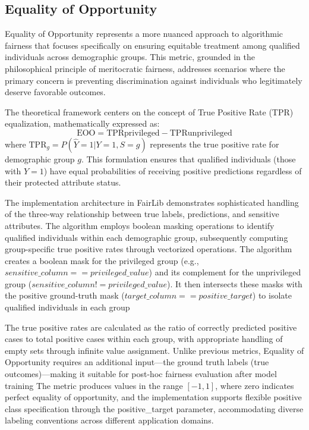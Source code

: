 \documentclass[12pt,a4paper,openright,twoside]{book}
\begin{document}
\subsection{Equality of Opportunity}

Equality of Opportunity represents a more nuanced approach to algorithmic fairness that focuses specifically on ensuring equitable treatment among qualified individuals across demographic groups. This metric, grounded in the philosophical principle of meritocratic fairness, addresses scenarios where the primary concern is preventing discrimination against individuals who legitimately deserve favorable outcomes.

The theoretical framework centers on the concept of True Positive Rate (TPR) equalization, mathematically expressed as:
\begin{equation}
\text{EOO} = \text{TPR} {\text{privileged}} - \text{TPR} {\text{unprivileged}}
\end{equation}
where $\text{TPR}_{g} = P(\hat{Y}=1|Y=1, S=g)$ represents the true positive rate for demographic group $g$. This formulation ensures that qualified individuals (those with $Y=1$) have equal probabilities of receiving positive predictions regardless of their protected attribute status.

The implementation architecture in FairLib demonstrates sophisticated handling of the three-way relationship between true labels, predictions, and sensitive attributes. The algorithm employs boolean masking operations to identify qualified individuals within each demographic group, subsequently computing group-specific true positive rates through vectorized operations. The algorithm creates a boolean mask for the privileged group (e.g., $sensitive\_column == privileged\_value$) and its complement for the unprivileged group ($sensitive\_column != privileged\_value$). It then intersects these masks with the positive ground-truth mask ($target\_column == positive\_target$) to isolate qualified individuals in each group

The true positive rates are calculated as the ratio of correctly predicted positive cases to total positive cases within each group, with appropriate handling of empty sets through infinite value assignment. Unlike previous metrics, Equality of Opportunity requires an additional input—the ground truth labels (true outcomes)—making it suitable for post-hoc fairness evaluation after model training The metric produces values in the range $[-1, 1]$, where zero indicates perfect equality of opportunity, and the implementation supports flexible positive class specification through the positive\_target parameter, accommodating diverse labeling conventions across different application domains.
\end{document}
